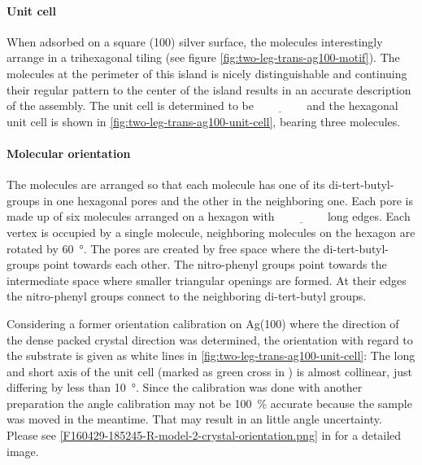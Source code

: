 \paragraph{Unit cell}
When adsorbed on a square (100) silver surface, the molecules interestingly arrange in a trihexagonal tiling (see figure \ref{fig:two-leg-trans-ag100-motif}). The molecules at the perimeter of this island is nicely distinguishable and continuing their regular pattern to the center of the island results in an accurate description of the assembly. The unit cell is determined to be $\underline{\qquad \qquad}$ and the hexagonal unit cell is shown in \autoref{fig:two-leg-trans-ag100-unit-cell}, bearing three molecules. 

\paragraph{Molecular orientation}
The molecules are arranged so that each molecule has one of its di-tert-butyl-groups in one hexagonal pores and the other in the neighboring one. Each pore is made up of six molecules arranged on a hexagon with $\underline{\qquad \qquad}$ long edges. Each vertex is occupied by a single molecule, neighboring molecules on the hexagon are rotated by \SI{60}{\degree}. The pores are created by free space where the di-tert-butyl-groups point towards each other. The nitro-phenyl groups point towards the intermediate space where smaller triangular openings are formed. At their edges the nitro-phenyl groups connect to the neighboring di-tert-butyl groups.

Considering a former orientation calibration on Ag(100) where the direction of the dense packed crystal direction was determined, the orientation with regard to the substrate is given as white lines in \autoref{fig:two-leg-trans-ag100-unit-cell}: The long and short axis of the unit cell (marked as green cross in ) is almost collinear, just differing by less than \SI{10}{\degree}. Since the calibration was done with another preparation the angle calibration may not be \SI{100}{\percent} accurate because the sample was moved in the meantime. That may result in an little angle uncertainty. Please see  \autoref{F160429-185245-R-model-2-crystal-orientation.png} in  for a detailed image.

